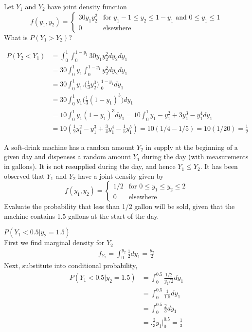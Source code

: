 \documentclass[answers]{exam}
\begin{document}
\begin{questions}
\question 
Let $Y_1$ and $Y_2$ have joint density function
\[ f(y_1,y_2) = \begin{cases}
	30y_1y_2^2 & \text{for } y_1-1\leq y_2\leq1-y_1 \text{ and } 0\leq y_1\leq1 \\
	0 & \text{elsewhere}
\end{cases} \]
What is $P(Y_1>Y_2)$?
\begin{solution}
	\begin{align*}
		P(Y_2<Y_1)
		&= \int_{0}^{1}\int_{0}^{1-y_1} 30y_1y_2^2 dy_2 dy_1 \\
		&= 30\int_{0}^{1}y_1\int_{0}^{1-y_1} y_2^2 dy_2 dy_1 \\
		&= 30\int_{0}^{1}y_1 \bigg.\bigg( \frac{1}{3}y_2^3 \bigg)\bigg|_{0}^{1-y_1} dy_1 \\
		&= 30\int_{0}^{1}y_1 \bigg( \frac{1}{3}(1-y_1)^3 \bigg) dy_1 \\
		&= 10\int_{0}^{1}y_1(1-y_1)^3 dy_1 
		= 10\int_{0}^{1} y_1-y_1^2+3y_1^3-y_1^4 dy_1 \\
		&= 10( \frac{1}{2}y_1^2-y_1^3+\frac{3}{4}y_1^4-\frac{1}{5}y_1^5 )
		= 10(1/4 - 1/5) = 10(1/20) = \frac{1}{2}
	\end{align*}
\end{solution}

\question 
A soft-drink machine has a random amount $Y_2$ in supply at the beginning of a given day and dispenses a random amount $Y_1$ during the day (with measurements in gallons). It is not resupplied during the day, and hence $Y_1\leq Y_2$. It has been observed that $Y_1$ and $Y_2$ have a joint density given by
\[ f(y_1,y_2) = \begin{cases}
	1/2 & \text{for } 0\leq y_1\leq y_2\leq2 \\ 0 & \text{elsewhere}
\end{cases}\]
Evaluate the probability that less than 1/2 gallon will be sold, given that the machine contains 1.5 gallons at the start of the day.
\begin{solution}
	$P(Y_1<0.5|y_2=1.5)$ \\
	First we find marginal density for $Y_2$
	\begin{align*}
		f_{Y_2} = \int_{0}^{y_2} \frac{1}{2} dy_1 =\frac{y_2}{2}
	\end{align*}
	Next, substitute into conditional probability,
	\begin{align*}
		P(Y_1<0.5|y_2=1.5) 
		&= \int_{0}^{0.5}\frac{1/2}{y_2/2} dy_1 \\
		&= \int_{0}^{0.5}\frac{1}{1.5} dy_1 \\
		&= \int_{0}^{0.5}\frac{2}{3} dy_1 \\
		&= \bigg. \frac{2}{3}y_1 \bigg|_{0}^{0.5}
		= \frac{1}{3}
	\end{align*}
\end{solution}


\end{questions}
\end{document}
